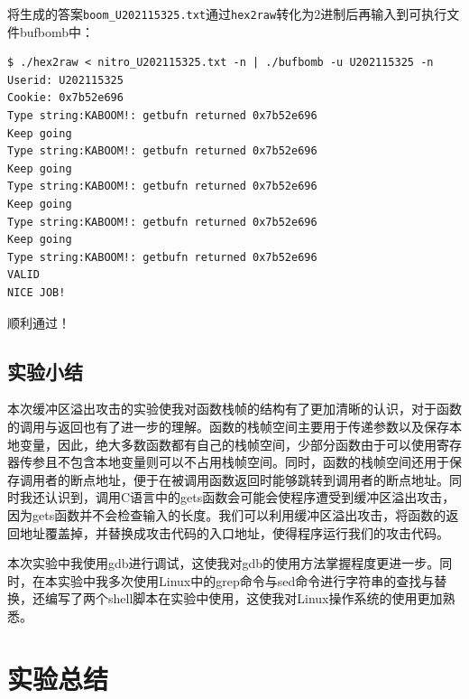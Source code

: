 \documentclass{paper}
\begin{document}
\begin{enumerate}
将生成的答案\verb|boom_U202115325.txt|通过\verb|hex2raw|转化为2进制后再输入到可执行文件bufbomb中：
\begin{lstlisting}
$ ./hex2raw < nitro_U202115325.txt -n | ./bufbomb -u U202115325 -n
Userid: U202115325
Cookie: 0x7b52e696
Type string:KABOOM!: getbufn returned 0x7b52e696
Keep going
Type string:KABOOM!: getbufn returned 0x7b52e696
Keep going
Type string:KABOOM!: getbufn returned 0x7b52e696
Keep going
Type string:KABOOM!: getbufn returned 0x7b52e696
Keep going
Type string:KABOOM!: getbufn returned 0x7b52e696
VALID
NICE JOB!
\end{lstlisting}
顺利通过！

\end{enumerate}

\subsection{实验小结}

本次缓冲区溢出攻击的实验使我对函数栈帧的结构有了更加清晰的认识，对于函数的调用与返回也有了进一步的理解。函数的栈帧空间主要用于传递参数以及保存本地变量，因此，绝大多数函数都有自己的栈帧空间，少部分函数由于可以使用寄存器传参且不包含本地变量则可以不占用栈帧空间。同时，函数的栈帧空间还用于保存调用者的断点地址，便于在被调用函数返回时能够跳转到调用者的断点地址。同时我还认识到，调用C语言中的gets函数会可能会使程序遭受到缓冲区溢出攻击，因为gets函数并不会检查输入的长度。我们可以利用缓冲区溢出攻击，将函数的返回地址覆盖掉，并替换成攻击代码的入口地址，使得程序运行我们的攻击代码。

本次实验中我使用gdb进行调试，这使我对gdb的使用方法掌握程度更进一步。同时，在本实验中我多次使用Linux中的grep命令与sed命令进行字符串的查找与替换，还编写了两个shell脚本在实验中使用，这使我对Linux操作系统的使用更加熟悉。

\section{实验总结}
\end{document}
